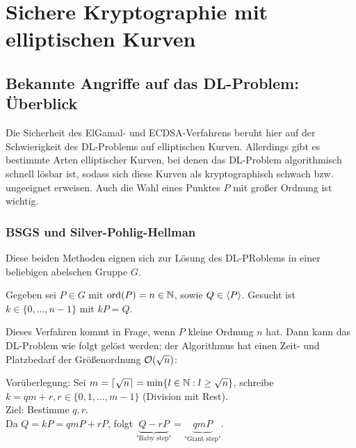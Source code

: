 \section{Sichere Kryptographie mit elliptischen Kurven}
\label{sec:para4}
\nextlecture
\subsection{Bekannte Angriffe auf das DL-Problem: Überblick}
\label{sub:4.1}
\begin{bem}
	Die Sicherheit des ElGamal- und ECDSA-Verfahrens beruht hier auf der Schwierigkeit des DL-Problems auf elliptischen Kurven. \marginnote{[19]}
	Allerdings gibt es bestimmte Arten elliptischer Kurven, bei denen das DL-Problem algorithmisch schnell lösbar ist, sodass sich diese Kurven als kryptographisch schwach bzw. ungeeignet erweisen.
	Auch die Wahl eines Punktes $P$ mit großer Ordnung ist wichtig.
\end{bem}

\subsubsection{BSGS und Silver-Pohlig-Hellman}
\label{subsub:4.1.1}
	Diese beiden Methoden eignen sich zur Lösung des DL-PRoblems in einer beliebigen abelschen Gruppe $G$.
	
\begin{defn}[DL-Problem in $G$]
	Gegeben sei $P \in G$ mit $\ord(P) = n \in \NN$, sowie $Q \in \sprod{P}$. Gesucht ist $k \in \{0,\dots,n-1\}$ mit $kP = Q$.
\end{defn}

\begin{defn}
	Dieses Verfahren kommt in Frage, wenn $P$ kleine Ordnung $n$ hat.
	Dann kann das DL-Problem wie folgt gelöst werden; der Algorithmus hat einen Zeit- und Platzbedarf der Größenordnung $\oh(\sqrt{n})$: 
\end{defn}

\begin{bem}
	Vorüberlegung: Sei $m = \ceil*{\sqrt{n}} = \min \{ l \in \NN : l \geq \sqrt{n}\}$, schreibe $k = qm + r, r \in \{0,1,\dots,m-1\}$ (Division mit Rest). \\
	Ziel: Bestimme $q, r$. \\
	Da $Q = kP = qmP + rP$, folgt $\underbrace{Q - rP}_{\text{"Baby step"}} = \underbrace{qmP}_{\text{"Giant step"}}$.
\end{bem}

